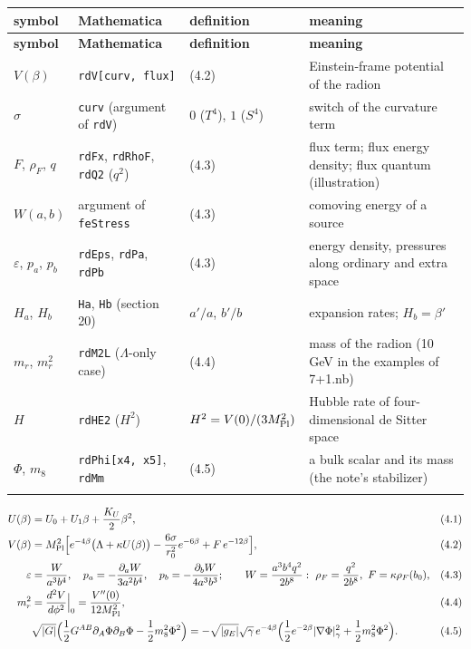 \documentclass[10pt,a4paper]{article}
\begin{document}
{\footnotesize
\begin{longtable}{>{\raggedright\arraybackslash}p{}>{\raggedright\arraybackslash}p{}>{\raggedright\arraybackslash}p{}>{\raggedright\arraybackslash}p{}}
\toprule
\textbf{symbol} & \textbf{Mathematica} & \textbf{definition} & \textbf{meaning} \\
\midrule\endfirsthead
\toprule
\textbf{symbol} & \textbf{Mathematica} & \textbf{definition} & \textbf{meaning} \\
\midrule\endhead
\endfoot
\bottomrule\endlastfoot
$V(\beta)$ & \texttt{rdV[curv, flux]} & (4.2) & Einstein-frame potential of the radion \\
$\sigma$ & \texttt{curv} (argument of \texttt{rdV}) & $0$ ($T^4$), $1$ ($S^4$) & switch of the curvature term \\
$F$, $\rho_F$, $q$ & \texttt{rdFx}, \texttt{rdRhoF}, \texttt{rdQ2} ($q^2$) & (4.3) & flux term; flux energy density; flux quantum (illustration) \\
$W(a,b)$ & argument of \texttt{feStress} & (4.3) & comoving energy of a source \\
$\varepsilon$, $p_a$, $p_b$ & \texttt{rdEps}, \texttt{rdPa}, \texttt{rdPb} & (4.3) & energy density, pressures along ordinary and extra space \\
$H_a$, $H_b$ & \texttt{Ha}, \texttt{Hb} (section 20) & $a'/a$, $b'/b$ & expansion rates; $H_b=\beta'$ \\
$m_r$, $m_r^2$ & \texttt{rdM2L} (\texorpdfstring{\ensuremath{\Lambda}}{Λ}-only case) & (4.4) & mass of the radion (10 GeV in the examples of 7+1.nb) \\
$H$ & \texttt{rdHE2} ($H^2$) & $H^2=V(0)/(3M_{\rm Pl}^2)$ & Hubble rate of four-dimensional de Sitter space \\
$\Phi$, $m_8$ & \texttt{rdPhi[x4, x5]}, \texttt{rdMm} & (4.5) & a bulk scalar and its mass (the note’s stabilizer) \\*
\end{longtable}}
\begin{align*}
U(\beta)&=U_0+U_1\beta+\frac{K_U}2\beta^2,&&(4.1) \\
V(\beta)&=M_{\rm Pl}^2\Big[e^{-4\beta}\big(\Lambda+\kappa U(\beta)\big)-\frac{6\sigma}{r_0^2}e^{-6\beta}+F\,e^{-12\beta}\Big],&&(4.2) \\
\varepsilon&=\frac W{a^3b^4},\quad p_a=-\frac{\partial_aW}{3a^2b^4},\quad p_b=-\frac{\partial_bW}{4a^3b^3};\qquad W=\frac{a^3b^4q^2}{2b^8}:\ \rho_F=\frac{q^2}{2b^8},\ F=\kappa\rho_F(b_0),&&(4.3) \\
m_r^2&=\frac{d^2V}{d\phi^2}\Big|_0=\frac{V''(0)}{12M_{\rm Pl}^2},&&(4.4) \\
&\sqrt{|G|}\Big(\frac12G^{AB}\partial_A\Phi\partial_B\Phi-\frac12m_8^2\Phi^2\Big)=-\sqrt{|g_E|}\sqrt\gamma\,e^{-4\beta}\Big(\frac12e^{-2\beta}|\nabla\Phi|_\gamma^2+\frac12m_8^2\Phi^2\Big).&&(4.5)
\end{align*}
\end{document}
